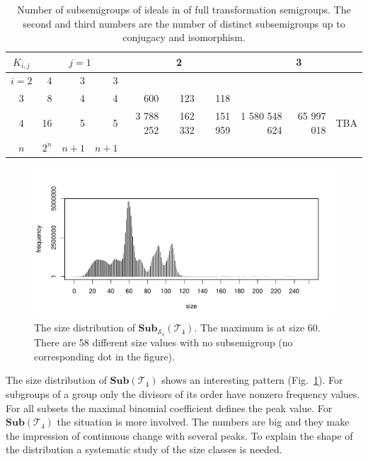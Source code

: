 \documentclass{amsart}
\newcommand{\cT}{{\mathcal T}}
\newcommand{\cS}{{\mathcal S}}
\newcommand{\Sub}{\mathbf{Sub}}
\theoremstyle{plain}
\theoremstyle{definition}
\begin{document}
\begin{table}
\renewcommand{\tabcolsep}{2pt}
\renewcommand{\arraystretch}{1}
\begin{tabular}{|c|r|r|r||r|r|r||r|r|r|}
\hline
$K_{i,j}$ & \multicolumn{3}{c||}{$j=1$} & \multicolumn{3}{c||}{2} & \multicolumn{3}{c|}{3} \\
\hline
$i=2$ & 4&3&3   & \cellcolor{gray9}  & \cellcolor{gray9}&  \cellcolor{gray9} & \cellcolor{gray9}  &\cellcolor{gray9} &\cellcolor{gray9}\\
\hline
$3$ &  8&4&4  &  600 & 123 & 118  & \cellcolor{gray9}  & \cellcolor{gray9}&\cellcolor{gray9}\\
\hline
$4$ & 16&5&5  &  3 788 252 & 162 332 & 151 959  & 1 580 548 624  & 65 997 018&TBA\\
\hline
$n$ & $2^n$&$n+1$&$n+1$    &    & &    &    & & \\
\hline

\end{tabular}
\caption{Number of subsemigroups of ideals in of full transformation semigroups. The second and third numbers are the number of distinct subsemigroups up to conjugacy and isomorphism.}
\end{table}



\begin{figure}
\includegraphics[width=\textwidth]{SubT4distrib}
\caption{The size distribution of $\Sub_{\cS_4}(\cT_4)$. The maximum is at size 60. There are 58 different size values with no subsemigroup (no corresponding dot in the figure).}
\label{fig:SubT4SizeDistrib}
\end{figure}
The size distribution of $\Sub(\cT_4)$ shows an interesting pattern (Fig.\ \ref{fig:SubT4SizeDistrib}).
For subgroups of a group only the divisors of its order have nonzero frequency values.
For all subsets the maximal binomial coefficient defines the peak value.
For $\Sub(\cT_4)$ the situation is more involved.
The numbers are big and they make the impression of continuous change with several peaks.
To explain the shape of the  distribution a systematic study of the size classes is needed. 
\end{document}
